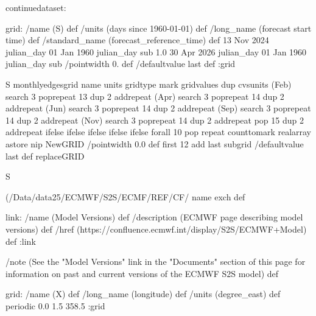 \begin{ingrid}
continuedataset:

grid:
/name (S) def
/units (days since 1960-01-01) def
/long_name (forecast start time) def
/standard_name (forecast_reference_time) def
13 Nov 2024 julian_day 01 Jan 1960 julian_day sub
1.0
30 Apr 2026 julian_day
01 Jan 1960 julian_day sub
/pointwidth 0. def
/defaultvalue { last } def
:grid

S monthlyedgesgrid
   name units gridtype mark gridvalues
        {dup cvsunits (Feb) search {3 {pop}repeat 13 {dup 2 add}repeat}{ 
         (Apr) search {3 {pop}repeat 14 {dup 2 add}repeat} { 
            (Jun) search {3 {pop}repeat 14 {dup 2 add}repeat} { 
               (Sep) search {3 {pop}repeat 14 {dup 2 add}repeat} { 
                  (Nov) search {3 {pop}repeat 14 {dup 2 add}repeat} 
                     {pop 15 {dup 2 add}repeat}
                     ifelse}
                  ifelse}
               ifelse}
            ifelse}
         ifelse
         }forall 
         10 {pop} repeat %
         counttomark realarray astore
        nip NewGRID
    /pointwidth 0.0 def
    first 12 add last subgrid
    /defaultvalue { last } def
    replaceGRID


S {(/Data/data25/ECMWF/S2S/ECMF/REF/CF/%
name exch def



link:
 /name (Model Versions) def
 /description (ECMWF page describing model versions) def
 /href (https://confluence.ecmwf.int/display/S2S/ECMWF+Model) def
:link

/note (See the "Model Versions" link in the "Documents" section of this page for information on past and current versions of the ECMWF S2S model) def

grid:
/name (X) def
/long_name (longitude) def
/units (degree_east) def
periodic
0.0 1.5 358.5
:grid

}
\end{ingrid}

